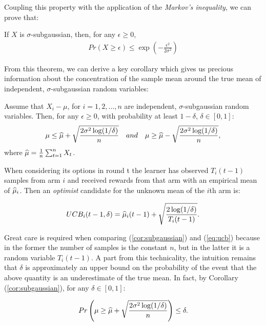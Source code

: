 Coupling this property with the application of the \emph{Markov's inequality}, we can prove that:

\begin{theorem} \cite{lattimore2019bandit} 
If $X$ is $\sigma$-subgaussian, then, for any $\epsilon\geq 0$,
\begin{align*}
Pr(X\geq\epsilon)\leq\exp\left(-\frac{\epsilon^2}{2\sigma^2}\right)
\end{align*}
\end{theorem}

From this theorem, we can derive a key corollary which gives us precious information about the concentration of the sample mean around the true mean of independent, $\sigma$-subgaussian random variables: 

\begin{corollary} \label{cor:subgaussian}
Assume that $X_i - \mu$, for $i=1,2,\dots,n$ are independent, $\sigma$-subgaussian random variables. Then, for any $\epsilon\geq 0$, with probability at least $1-\delta$, $\delta\in [0,1]$: 
\begin{align*}
\mu\leq\widehat{\mu}+\sqrt{\frac{2\sigma^2\log(1/\delta)}{n}} \enspace\enspace and \enspace\enspace \mu\geq\widehat{\mu}-\sqrt{\frac{2\sigma^2\log(1/\delta)}{n}},
\end{align*}
where $\widehat{\mu}=\frac{1}{n}\sum_{t=1}^{n}X_t$.
\end{corollary}

When considering its options in round t the learner has observed $T_i(t-1)$ samples from arm $i$ and received rewards from that arm with an empirical mean of $\widehat{\mu}_i$. Then an \emph{optimist} candidate for the unknown mean of the $i$th arm is:

\begin{align} \label{eq:ucb}
UCB_i(t-1, \delta) = \widehat{\mu}_i(t-1) + \sqrt{\frac{2\log(1/\delta)}{T_i(t-1)}}.
\end{align}

Great care is required when comparing (\ref{cor:subgaussian}) and (\ref{eq:ucb}) because in the former the number of samples is the constant $n$, but in the latter it is a random variable
$T_i(t-1)$. A part from this technicality, the intuition remains that $\delta$ is approximately an upper bound on the probability of the event that the above quantity is an underestimate of the true mean. In fact, by Corollary (\ref{cor:subgaussian}), for any $\delta\in [0,1]$:

\begin{align}
Pr\left(\mu\geq\widehat{\mu}+\sqrt{\frac{2\sigma^2\log(1/\delta)}{n}}\right)\leq\delta.
\end{align}

